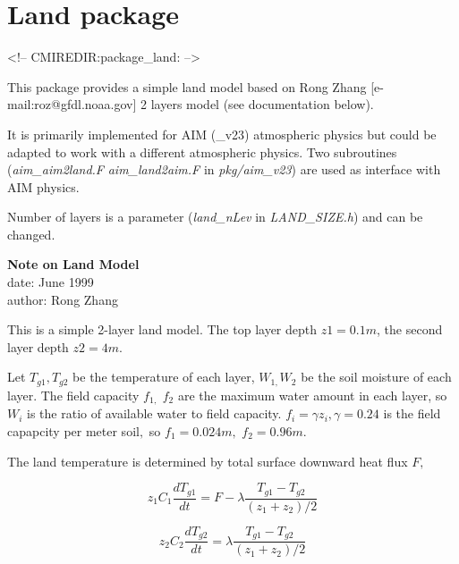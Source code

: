 \section{Land package}
\label{sec:pkg:land}
\begin{rawhtml}
<!-- CMIREDIR:package_land: -->
\end{rawhtml}

This package provides a simple land model
based on Rong Zhang [e-mail:roz@gfdl.noaa.gov] 2 layers model
(see documentation below).

It is primarily implemented for AIM (\_v23) atmospheric physics
but could be adapted to work with a different atmospheric physics.
Two subroutines ({\it aim\_aim2land.F} {\it aim\_land2aim.F}
in {\it pkg/aim\_v23}) are used as interface with AIM physics. 

Number of layers is a parameter ({\it land\_nLev} in {\it LAND\_SIZE.h})
and can be changed. 



% 

\begin{center}
{\bf Note on Land Model}\\
date: June 1999\\
author: Rong Zhang\\
\end{center}


This is a simple 2-layer land model. The top layer depth $z1=0.1m$, the
second layer depth $z2=4m$.

Let $T_{g1},T_{g2}$ be the temperature of each layer, $W_{1,}W_{2}$ be the
soil moisture of each layer. The field capacity $f_{1,}$ $f_{2}$ are the
maximum water amount in each layer, so $W_{i}$ is the ratio of available
water to field capacity. $f_{i}=\gamma z_{i},\gamma =0.24$ is the field
capapcity per meter soil$,$ so $f_{1}=0.024m,$ $f_{2}=0.96m.$

The land temperature is determined by total surface downward heat flux $F,$

\begin{equation}
z_{1}C_{1}\frac{dT_{g1}}{dt}=F-\lambda \frac{T_{g1}-T_{g2}}{(z_{1}+z_{2})/2}
\end{equation}

\begin{center}
\begin{equation}
z_{2}C_{2}\frac{dT_{g2}}{dt}=\lambda \frac{T_{g1}-T_{g2}}{(z_{1}+z_{2})/2}
\end{equation}
\end{center}

